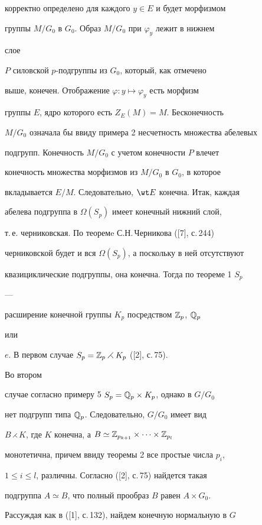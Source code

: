 корректно определено для каждого $y\in E$ и будет морфизмом  


группы $M/G_0$ в $G_0$. Образ $M/G_0$ при $\varphi_y$ лежит в нижнем 


слое 


$P$ силовской $p$-подгруппы из $G_0$, который, как отмечено 


выше, конечен. Отображение $\varphi:y\mapsto\varphi_y$ есть морфизм 


группы $E$, ядро которого есть $Z_E(M)=M$. Бесконечность 


$M/G_0$ означала бы ввиду примера 2 несчетность множества абелевых 


подгрупп. Конечность $M/G_0$ с учетом конечности $P$ влечет 


конечность множества морфизмов из $M/G_0$ в $G_0$, в которое 


вкладывается $E/M$. Следовательно, $\wt E$ конечна. Итак, каждая 


абелева подгруппа в $\Omega(S_p)$ имеет конечный нижний слой, 


т.\,е. черниковская. По теоремe С.Н.\,Черникова ([7], с.\,244) 


черниковской будет и вся $\Omega(S_p)$, а поскольку в ней отсутствуют  


квазициклические подгруппы, она конечна. Тогда по теореме 1\; $S_p$ 


--- 


расширение конечной группы $K_p$ посредством $\Bbb Z_p$, $\Bbb Q_p$ 


или 


$e$. В первом случае $S_p=\Bbb Z_p\rightthreetimes K_p$ ([2], с.\,75). 


Во втором  


случае согласно примеру 5\; $S_p=\Bbb Q_p\times K_p$, однако в $G/G_0$ 


нет подгрупп типа $\Bbb Q_p$. Следовательно, $G/G_0$ имеет вид 


$B\rightthreetimes K$, где $K$ конечна, а $B\simeq\Bbb 


Z_{p_{k+1}}\times\dotsb\times\Bbb Z_{p_l}$ 


монотетична, причем ввиду теоремы 2 все простые числа $p_i$, 


$1\le i\le l$, различны. Согласно ([2], с.\,75) найдется такая 


подгруппа $A\simeq B$, что полный прообраз $B$ равен $A\times G_0$. 


Рассуждая как в ([1], с.\,132), найдем конечную нормальную в $G$ 


